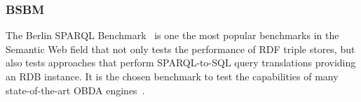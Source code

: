 \subsubsection{BSBM}
The Berlin SPARQL Benchmark~\citep{bizer2009berlin} is one the most popular benchmarks in the Semantic Web field that not only tests the performance of RDF triple stores, but also tests approaches that perform SPARQL-to-SQL query translations providing an RDB instance. It is the chosen benchmark to test the capabilities of many state-of-the-art OBDA engines~\citep{priyatna2014formalisation,calvanese2017ontop,mami2019squerall}. 
 
\begin{figure}[!ht]
  \centering
  \qquad
\end{figure}
